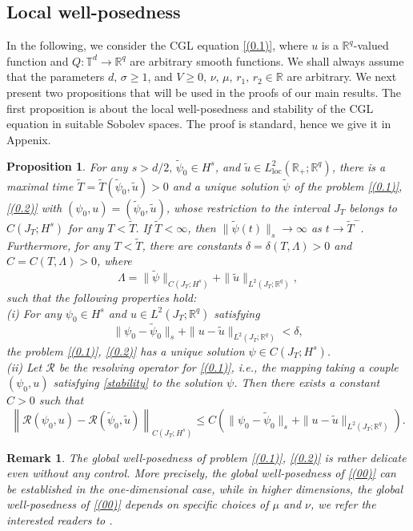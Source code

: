 \documentclass[review]{elsarticle}
\newtheorem{proposition}{Proposition}[section]
\newtheorem{remark}{Remark}[section]
\theoremstyle{dotless}
\def\R {\mathbb{R}}
\def \leq{\leqslant}
\def \geq{\geqslant}
\numberwithin{equation}{section}
\begin{document}
\subsection{Local well-posedness}
In the following, we consider the CGL equation \eqref{(0.1)}, where $u$ is a  $\mathbb{R}^q$-valued function and $Q: \mathbb{T}^d \rightarrow \mathbb{R}^q$ are arbitrary smooth functions. 
We shall always assume that the parameters $d,\, \sigma\geq 1$, and $V\geq0,\, \nu,\, \mu,\, r_1,\, r_2\in \R$ are arbitrary. We next present two propositions that will be used in the proofs of our main results. 
The first proposition is about the local well-posedness and stability of the CGL equation in suitable Sobolev spaces. The proof is standard, hence we give it in Appenix.
\begin{proposition}\label{prop1.1}
For any $s>d / 2,\, \tilde{\psi}_0 \in H^s$, and $\tilde{u} \in L_{\text{loc}}^2\left(\mathbb{R}_{+} ; \mathbb{R}^q\right)$, there is a maximal time $\tilde{T}=\tilde{T}\left(\tilde{\psi}_0, \tilde{u}\right)>0$ and a unique solution $\tilde{\psi}$ of the problem \eqref{(0.1)}, \eqref{(0.2)} with $\left(\psi_0, u\right)=\left(\tilde{\psi}_0, \tilde{u}\right)$, whose restriction to the interval $J_T$ belongs to $C\left(J_T ; H^s\right)$ for any $T<\tilde{T}$. If $\tilde{T}<\infty$, then $\|\tilde{\psi}(t)\|_s \rightarrow \infty$ as $t \rightarrow \tilde{T}^{-}$. Furthermore, for any $T<\tilde{T}$, there are constants $\delta=\delta(T, \Lambda)>0$ and $C=C(T, \Lambda)>0$, where
$$
\Lambda=\|\tilde{\psi}\|_{C\left(J_T ; H^s\right)}+\|\tilde{u}\|_{L^2\left(J_T ; \mathbb{R}^q\right)},
$$
such that the following properties hold:\\
(i) For any $\psi_0 \in H^s$ and $u \in L^2\left(J_T ; \mathbb{R}^q\right)$ satisfying
\begin{equation}\label{stability}
 \|\psi_0-\tilde{\psi}_0 \|_s+\|u-\tilde{u}\|_{L^2\left(J_T ; \mathbb{R}^q\right)}<\delta,
\end{equation}
the problem \eqref{(0.1)}, \eqref{(0.2)} has a unique solution $\psi \in C\left(J_T ; H^s\right)$.\\
(ii) Let $\mathcal{R}$ be the resolving operator for \eqref{(0.1)}, i.e., the mapping taking a couple $\left(\psi_0, u\right)$ satisfying \eqref{stability} to the solution $\psi$. Then there exists a constant $C>0$ such that
\begin{equation}\label{continuity}
\left\|\mathcal{R}\left(\psi_0, u\right)-\mathcal{R}\left(\tilde{\psi}_0, \tilde{u}\right)\right\|_{C\left(J_T ; H^s\right)} \leq C\left( \|\psi_0-\tilde{\psi}_0 \|_s+\|u-\tilde{u}\|_{L^2\left(J_T ; \mathbb{R}^q\right)}\right) .
\end{equation}
\end{proposition}
\begin{remark}
	The global well-posedness of problem \eqref{(0.1)}, \eqref{(0.2)} is rather delicate even without any control.  More precisely, the global well-posedness of \eqref{(00)} can be established in the one-dimensional case, while in higher dimensions, the global well-posedness of \eqref{(00)} depends on specific choices of $\mu$ and $\nu$, we refer the interested readers to \cite[Theorem~3.1.39]{GuoJiangLi}.
\end{remark}
\end{document}
